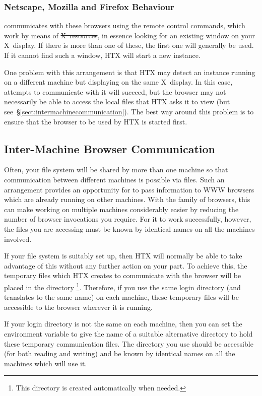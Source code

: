 \subsubsection{Netscape, Mozilla and Firefox Behaviour}

 communicates with these browsers using
the remote control commands, which work by means of \st{X~resources}, in
essence looking for an existing window on your X~display. If there is more
than one of these, the first one will generally be used. If it cannot find
such a window, HTX will start a new instance.

One problem with this arrangement is that HTX may detect an instance running
on a different machine but displaying on the same X~display. In this case,
attempts to communicate with it will succeed, but the browser may not
necessarily be able to access the local files that HTX asks it to view (but
see~\S\ref{sect:intermachinecommunication}). The best way around this problem
is to ensure that the browser to be used by HTX is started first.

\subsection{\label{sect:intermachinecommunication}Inter-Machine Browser Communication}

Often, your file system will be shared by more than one machine so
that communication between different machines is possible via
files. Such an arrangement provides an opportunity for
 to pass information to WWW browsers which are
already running on other machines. With the
 family of browsers, this can make working on
multiple machines considerably easier by reducing the number of browser
invocations you require. For it to work successfully, however, the
files you are accessing must be known by identical names on all the
machines involved.

If your file system is suitably set up, then HTX will normally be able
to take advantage of this without any further action on your part. To
achieve this, the temporary files which HTX creates to communicate
with the browser will be placed in the directory
\footnote{This directory is created automatically
when needed.}. Therefore, if you use the same login directory (and
 translates to the same name) on each machine, these
temporary files will be accessible to the browser wherever it is
running.

If your login directory is not the same on each machine, then you can
set the environment variable  to give the name of a
suitable alternative directory to hold these temporary communication
files. The directory you use should be accessible (for both reading
and writing) and be known by identical names on all the machines which
will use it.


